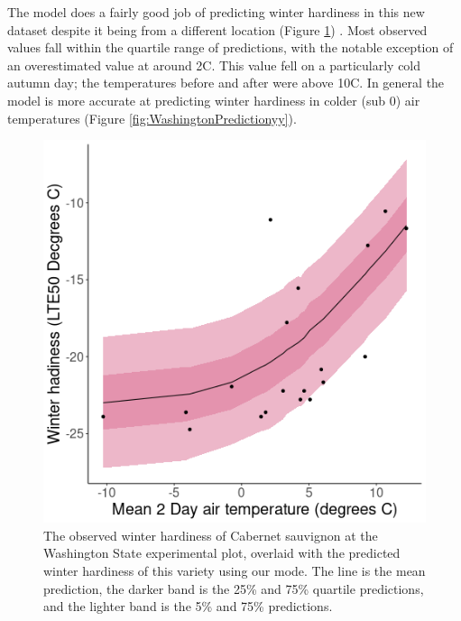 \documentclass[11pt,letter]{article}
\begin{document}
The model does a fairly good job of predicting winter hardiness in this new dataset despite it being from a different location (Figure \ref{fig:WashingtonPredictionxy})  . Most observed values fall within the quartile range of predictions, with the notable exception of an overestimated value at around 2\textdegree C. This value fell on a particularly cold autumn day; the temperatures before and after were above 10\textdegree C. In general the model is more accurate at predicting winter hardiness in colder (sub 0) air temperatures (Figure \ref{fig:WashingtonPredictionyy}). \\



\begin{figure}
  \includegraphics[scale = 0.75]{WashingtonPrediction.png}
  \caption{The observed winter hardiness of Cabernet sauvignon at the Washington State experimental plot, overlaid with the predicted winter hardiness of this variety using our mode. The line is the mean prediction, the darker band is the 25\% and 75\% quartile predictions, and the lighter band is the 5\% and 75\% predictions.   }
  \label{fig:WashingtonPredictionxy}
\end{figure}
\end{document}
